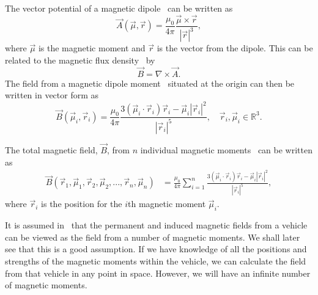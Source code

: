The vector potential of a magnetic dipole~\cite{Nordling:1995:PHS, feynman} can be written as
\begin{equation}
 \vec{A}(\vec{\mu},\vec{r}) = \frac{\mu_0}{4\pi}\frac{\vec{\mu}\times\vec{r}}{\left|\vec{r}\right|^3}, 
\end{equation}
where $\vec{\mu}$ is the magnetic moment and $\vec{r}$ is the vector from the dipole. This can be related to the magnetic flux density~\cite{Nordling:1995:PHS} by
\begin{equation}
	\vec{B} = \nabla \times \vec{A}.
\end{equation}
The field from a magnetic dipole moment~\cite{imego2007} situated at the origin can then be written in vector form as
\begin{equation}
 \vec{B}(\vec{\mu}_i,\vec{r}_i)=\frac{\mu_0}{4\pi} \frac{3\left(\vec{\mu}_i \cdot \vec{r}_i \right) \vec{r}_i - \vec{\mu}_i\left|\vec{r}_i\right|^2}{\left|\vec{r}_i\right|^5},\quad \vec{r}_i, \vec{\mu}_i \in \mathbb{R}^3.
\end{equation}

The total magnetic field, $\vec{B}$, from $n$ individual magnetic moments~\cite{imego2007} can be written as
\begin{align}
\vec{B}(\vec{r}_1,\vec{\mu}_1, \vec{r}_2, \vec{\mu}_2,...,\vec{r}_n,\vec{\mu}_n) &= \frac{\mu_0}{4\pi} \sum_{i=1}^{n} \frac{3\left(\vec{\mu}_i \cdot \vec{r}_i \right) \vec{r}_i - \vec{\mu}_i\left|\vec{r}_i\right|^2}{\left|\vec{r}_i\right|^5},
\end{align}
where $\vec{r}_i$ is the position for the $i$th magnetic moment $\vec{\mu}_i$.

It is assumed in~\cite{imego2007} that the permanent and induced magnetic fields from a vehicle can be viewed as the field from a number of magnetic moments. We shall later see that this is a good assumption. If we have knowledge of all the positions and strengths of the magnetic moments within the vehicle, we can calculate the field from that vehicle in any point in space. However, we will have an infinite number of magnetic moments.

